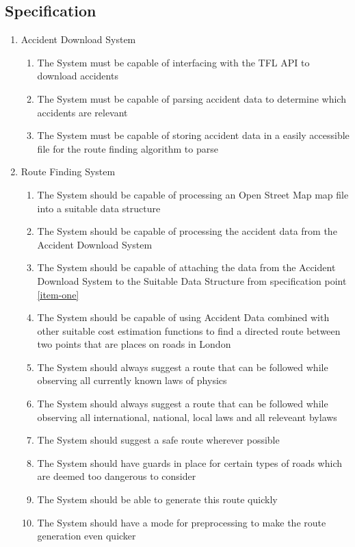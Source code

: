 \documentclass[11pt,twoside,a4paper]{article}
\begin{document}
\subsection{Specification}
\begin{enumerate}
\item Accident Download System
\begin{enumerate}
    \item The System must be capable of interfacing with the TFL API to download accidents
    \item The System must be capable of parsing accident data to determine which accidents are relevant
    \item The System must be capable of storing accident data in a easily accessible file for the route finding algorithm to parse
\end{enumerate} 
\item Route Finding System
\begin{enumerate}[label=\arabic{enumi}.\arabic*]
    \item \label{item-one} The System should be capable of processing an Open Street Map map file into a suitable data structure
    \item The System should be capable of processing the accident data from the Accident Download System
    \item The System should be capable of attaching the data from the Accident Download System to the Suitable Data Structure from specification point \ref{item-one}
    \item The System should be capable of using Accident Data combined with other suitable cost estimation functions to find a directed route between two points that are places on roads in London
    \item \label{item-five}The System should always suggest a route that can be followed while observing all currently known laws of physics
    \item The System should always suggest a route that can be followed while observing all international, national, local laws and all releveant bylaws
    \item The System should suggest a safe route wherever possible
    \item The System should have guards in place for certain types of roads which are deemed too dangerous to consider
    \item The System should be able to generate this route quickly
    \item The System should have a mode for preprocessing to make the route generation even quicker

\end{enumerate}
\end{enumerate}
\end{document}
